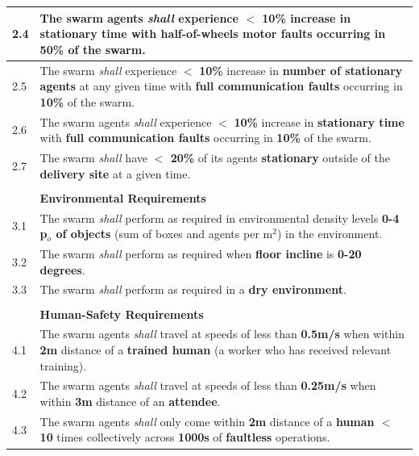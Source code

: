 \documentclass[runningheads]{llncs}
\begin{document}
\begin{table}[!t]
\begin{tabular}{p{5mm} p{125mm} }
		\hline
		2.4 & The swarm agents \emph{shall} experience $<$ \textbf{10\%} increase in \textbf{stationary time} with \textbf{half-of-wheels motor faults} occurring in \textbf{50\%} of  the swarm.\\ 
		\hline
		2.5 & The swarm \emph{shall} experience $<$ \textbf{10\%} increase in \textbf{number of stationary agents} at any given time with \textbf{full communication faults} occurring in \textbf{10\%} of the swarm.\\
		\hline
		2.6 & The swarm agents \emph{shall} experience $<$ \textbf{10\%} increase in \textbf{stationary time} with \textbf{full communication faults} occurring in \textbf{10\%} of the swarm. \\	
		\hline
		2.7 & The swarm \emph{shall} have \textbf{$<$ 20\%} of its agents \textbf{stationary} outside of the \textbf{delivery site} at a given time. \\ 
        \hline \\[-1.25\medskipamount]
	    & \textbf{Environmental Requirements} \\ 
		\hline
		3.1 & The swarm \emph{shall} perform as required in environmental density levels \textbf{0-4 p$_o$ of objects} (sum of boxes and agents per m$^2$) in the environment. %
		\\ 
		\hline
		3.2 & The swarm \emph{shall} perform as required when \textbf{floor incline} is \textbf{0-20 degrees}.
		\\ 
		\hline
		3.3 & The swarm \emph{shall} perform as required in a \textbf{dry environment}.
		\\ 
		\hline \\[-1.25\medskipamount]
		& \textbf{Human-Safety Requirements}\\
	\hline
4.1 & The swarm agents \emph{shall} travel at speeds of less than \textbf{0.5m/s} when within \textbf{2m} distance of a \textbf{trained human} (a worker who has received relevant training).
\\ 
\hline
4.2 & The swarm agents \emph{shall} travel at speeds of less than \textbf{0.25m/s} when within \textbf{3m} distance of an \textbf{attendee}.
\\ 
\hline
4.3 & The swarm agents \emph{shall} only come within \textbf{2m} distance of a \textbf{human $<$ 10} times collectively across \textbf{1000s} of \textbf{faultless} operations.
\\ 
\hline

\end{tabular}
\end{table}
\end{document}
